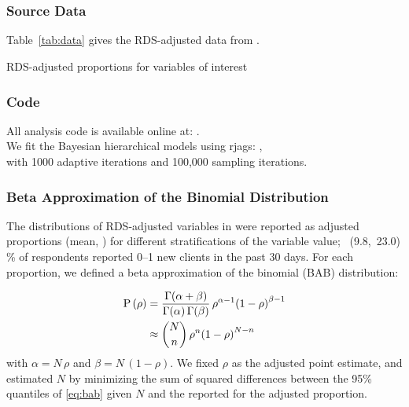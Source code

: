 \part{}\label{app}
\section{Source Data}\label{app.data}
Table~\ref{tab:data} gives the RDS-adjusted data from \cite{Baral2014}.
\begin{table}[h]
  \centering
  \caption{RDS-adjusted proportions for variables of interest}
  \label{tab:data}
  
\end{table}
\section{Code}\label{app.code}
All analysis code is available online at: .\\
We fit the Bayesian hierarchical models using rjags: ,\\
with 1000 adaptive iterations and 100,000 sampling iterations.
\section{Beta Approximation of the Binomial Distribution}\label{app.bab}
The distributions of RDS-adjusted variables in \cite{Baral2014} were reported as
adjusted proportions (mean, \ci) for different stratifications of the variable value;
~(9.8,~23.0)\,\% of respondents reported 0--1 new clients in the past 30 days.
For each proportion, we defined a beta approximation of the binomial (BAB) distribution:
\par %
\begin{align}\label{eq:bab}
  \mathrm{P}\,(\rho) &=
    \frac{\Gamma(\alpha+\beta)}{\Gamma(\alpha)\,\Gamma(\beta)}\,
    \rho^{\alpha-1}{(1 - \rho)}^{\beta-1} \\
    &\approx {N \choose n} \, \rho^{n}{(1 - \rho)}^{N - n} \nonumber
\end{align}
with $\alpha = N\,\rho$ and $\beta = N\,(1-\rho)$.
We fixed $\rho$ as the adjusted point estimate,
and estimated $N$ by minimizing the sum of squared differences between
the 95\% quantiles of \eqref{eq:bab} given $N$ and the reported \ci for the adjusted proportion.

